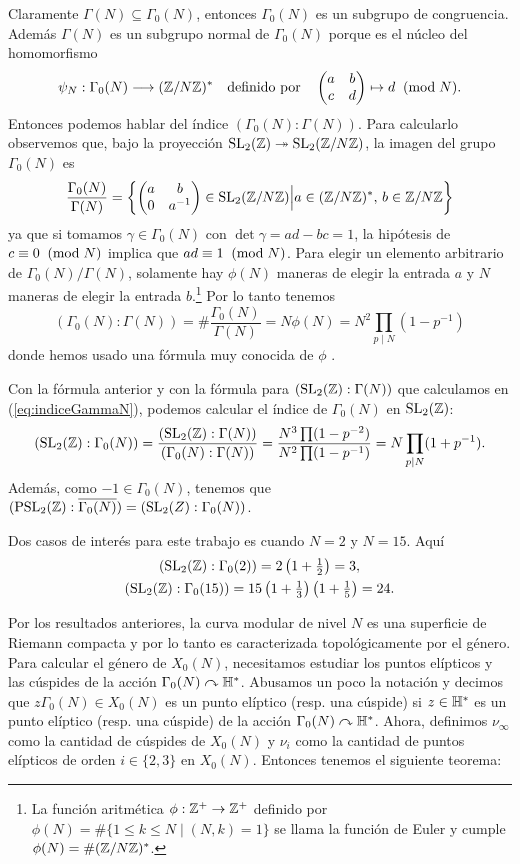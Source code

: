 Claramente $\Gamma(N)\subseteq\Gamma_0(N)$, entonces $\Gamma_0(N)$ es un subgrupo de congruencia.
Adem\'as $\Gamma(N)$ es un subgrupo normal de $\Gamma_0(N)$ porque es el n\'ucleo del homomorfismo
\[
  \psi_N:\Gamma_0(N)\longrightarrow(\mathbb{Z}/N\mathbb{Z})^*\quad\text{definido por}\quad \begin{pmatrix}a & b\\ c & d\end{pmatrix}\mapsto d\;\;(\mathrm{mod}\; N).
\]
Entonces podemos hablar del \'indice $(\Gamma_0(N):\Gamma(N))$. Para calcularlo observemos que,
bajo la proyecci\'on $\mathrm{SL}_2(\mathbb{Z})\twoheadrightarrow\mathrm{SL}_2(\mathbb{Z}/N\mathbb{Z})$, la imagen del grupo $\Gamma_0(N)$ es
\[
  \frac{\Gamma_0(N)}{\Gamma(N)}=
  \left\{ \begin{pmatrix}a & b\\ 0 & a^{-1}\end{pmatrix}\in\mathrm{SL}_2(\mathbb{Z}/N\mathbb{Z}) \Big| a\in(\mathbb{Z}/N\mathbb{Z})^*,\, b\in\mathbb{Z}/N\mathbb{Z}\right\}
\]
ya que si tomamos $\gamma\in\Gamma_0(N)$ con $\det\gamma=ad-bc=1$, la hip\'otesis de
$c\equiv0\;\;(\mathrm{mod}\; N)$ implica que $ad\equiv1\;\;(\mathrm{mod}\; N)$. Para elegir un elemento arbitrario de
$\Gamma_0(N)/\Gamma(N)$,  solamente hay $\phi(N)$ maneras de elegir la entrada $a$ y  $N$ maneras de
elegir la entrada $b$.\footnote{La funci\'on aritm\'etica
  $\phi:\mathbb{Z}^+\rightarrow\mathbb{Z}^+$ definido por $\phi(N)=\#\{1\leq k\leq N\mid (N,k)=1\}$ se llama la funci\'on
  de Euler y cumple $\phi(N)=\#(\mathbb{Z}/N\mathbb{Z})^*$.} Por lo tanto tenemos
\[
  (\Gamma_0(N):\Gamma(N))=\#\frac{\Gamma_0(N)}{\Gamma(N)}=N\phi(N)=N^2\prod_{p\mid N}(1-p^{-1})
\]
donde hemos usado una f\'ormula muy conocida de $\phi$
\cite[Proposici\'on 2.2.5]{IrelandRosenACITMNT}.

Con la f\'ormula anterior y con la f\'ormula para $(\mathrm{SL}_2(\mathbb{Z}):\Gamma(N))$ que calculamos en
(\ref{eq:indiceGammaN}), podemos calcular el \'indice de $\Gamma_0(N)$ en $\mathrm{SL}_2(\mathbb{Z})$:
\begin{equation}\label{eq:indice-gamma0n}
  (\mathrm{SL}_2(\mathbb{Z}):\Gamma_0(N))=
  \frac{(\mathrm{SL}_2(\mathbb{Z}):\Gamma(N))}{(\Gamma_0(N):\Gamma(N))}=
  \frac{N^3\prod (1-p^{-2})}{N^2\prod(1-p^{-1})}=N\prod_{p\mid N}(1+p^{-1}).
\end{equation}
Adem\'as, como $-1\in\Gamma_0(N)$, tenemos que $(\mathrm{PSL}_2(\mathbb{Z}):\overline{\Gamma_0(N)})=(\mathrm{SL}_2(Z):\Gamma_0(N))$.

\begin{ejemplo}\label{ej:indicequince}
  Dos casos de inter\'es para este trabajo es cuando $N=2$ y $N=15$. Aqu\'i
  \begin{gather*}
  (\mathrm{SL}_2(\mathbb{Z}):\Gamma_0(2))=2\left( 1+\tfrac{1}{2} \right)=3,\\
    (\mathrm{SL}_2(\mathbb{Z}):\Gamma_0(15))=15\left( 1+\tfrac{1}{3} \right)\left( 1+\tfrac{1}{5} \right)=24.
  \end{gather*}
\end{ejemplo}

Por los resultados anteriores, la curva modular de nivel $N$ es una superficie de Riemann compacta
y por lo tanto es caracterizada topol\'ogicamente por el g\'enero. Para calcular el g\'enero de
$X_0(N)$, necesitamos estudiar los puntos el\'ipticos y las c\'uspides de la acci\'on
$\Gamma_0(N)\curvearrowright\mathbb{H}^*$. Abusamos un poco la notaci\'on y decimos que $z\Gamma_0(N)\in X_0(N)$ es un
punto el\'iptico (resp. una c\'uspide) si $z\in\mathbb{H}^*$ es un punto el\'iptico (resp. una c\'uspide)
de la acci\'on $\Gamma_0(N)\curvearrowright\mathbb{H}^*$. Ahora, definimos $\nu_{\infty}$ como la cantidad de c\'uspides
de $X_0(N)$ y $\nu_i$ como la cantidad de puntos el\'ipticos de orden $i\in\{2,3\}$ en $X_0(N)$.
Entonces tenemos el siguiente teorema:

